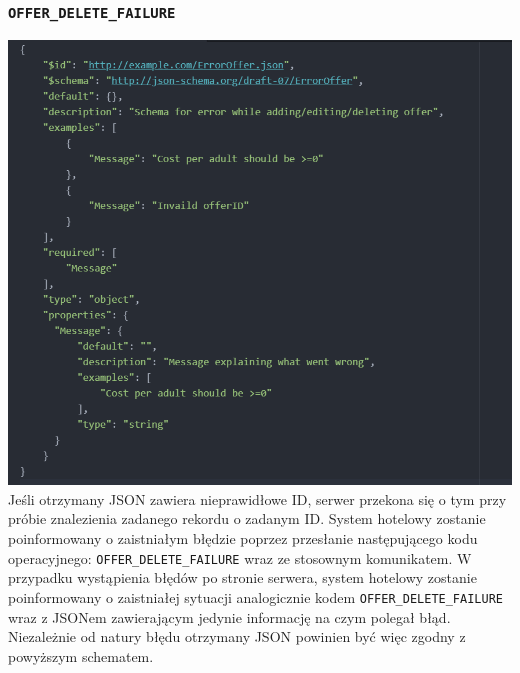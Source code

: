\documentclass{article}
\begin{document}
\subsubsection{\texttt{OFFER\_DELETE\_FAILURE}}
\includegraphics[width=\linewidth]{Oferta-Hotel-Serwer/Offer_Error.png}
Jeśli otrzymany JSON zawiera nieprawidłowe ID, serwer przekona się o tym przy próbie znalezienia zadanego rekordu o zadanym ID. System hotelowy zostanie poinformowany o zaistniałym błędzie poprzez przesłanie następującego kodu operacyjnego: \texttt{OFFER\_DELETE\_FAILURE} wraz ze stosownym komunikatem.
W przypadku wystąpienia błędów po stronie serwera, system hotelowy zostanie poinformowany o zaistniałej sytuacji analogicznie kodem \texttt{OFFER\_DELETE\_FAILURE} wraz z JSONem zawierającym jedynie informację na czym polegał błąd. Niezależnie od natury błędu otrzymany JSON powinien być więc zgodny z powyższym schematem.
\newpage
\end{document}
